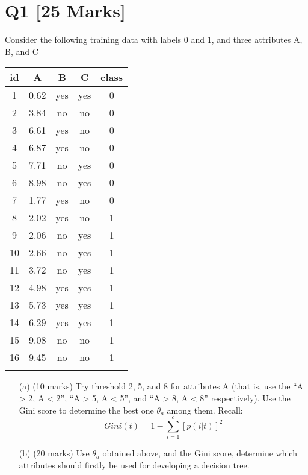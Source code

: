 \section*{Q1 [25 Marks]}

Consider the following training data with labels 0 and 1, and three
attributes A, B, and C


\begin{table}[H]
    \centering
    \begin{tabular}{ccccc}
        \hline
        \addlinespace[-0.5ex] %
        \hline
        id & A & B & C & class \\
        \hline
        1 & 0.62 & yes & yes & 0 \\
        \hline
        2 & 3.84 & no & no & 0 \\
        \hline
        3 & 6.61 & yes & no & 0 \\
        \hline
        4 & 6.87 & yes & no & 0 \\
        \hline
        5 & 7.71 & no & yes & 0 \\
        \hline
        6 & 8.98 & no & yes & 0 \\
        \hline
        7 & 1.77 & yes & no & 0 \\
        \hline
        8 & 2.02 & yes & no & 1 \\
        \hline
        9 & 2.06 & no & yes & 1 \\
        \hline
        10 & 2.66 & no & yes & 1 \\
        \hline
        11 & 3.72 & no & yes & 1 \\
        \hline
        12 & 4.98 & yes & yes & 1 \\
        \hline
        13 & 5.73 & yes & yes & 1 \\
        \hline
        14 & 6.29 & yes & yes & 1 \\
        \hline
        15 & 9.08 & no & no & 1 \\
        \hline
        16 & 9.45 & no & no & 1 \\
        \hline
        \addlinespace[-0.5ex] %
        \hline
    \end{tabular}
\end{table}

\begin{itemize}
    \item[(a)] (10 marks) Try threshold 2, 5, and 8 for attributes A (that is, use the “A > 2, A < 2”, “A > 5, A < 5”, and “A > 8, A < 8” respectively). Use the Gini score to determine the best one $\theta_a$ among them. Recall:
    \begin{equation*}
        Gini(t) = 1 - \sum_{i = 1}^{c} [p(i|t)]^2  
    \end{equation*}
    \item[(b)] (20 marks) Use $\theta_a$ obtained above, and the Gini score, determine which attributes should firstly be used for developing a decision tree.
\end{itemize}

